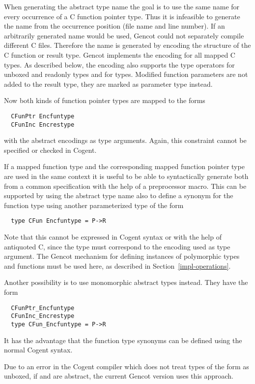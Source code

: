 When generating the abstract type name the goal is to use the same name 
for every occurrence of a C function pointer type. Thus it is infeasible to generate the name from 
the occurrence position (file name and line number). If an arbitrarily generated name would be used, 
Gencot could not separately compile different C files. Therefore the name is generated by encoding the structure of the 
C function or result type. Gencot implements the encoding for all mapped C types. As described
below, the encoding also supports the type operators for unboxed and readonly types and for  types.
Modified function parameters are not added to the result type, they are marked as parameter type instead.

Now both kinds of function pointer types are mapped to the forms
\begin{verbatim}
  CFunPtr Encfuntype
  CFunInc Encrestype
\end{verbatim}
with the abstract encodings as type arguments. Again, this constraint cannot be specified or checked in Cogent.

If a mapped function type and the corresponding mapped function pointer type are used in the same context it is useful to 
be able to syntactically generate both from a common specification with the help of a preprocessor macro. This can be
supported by using the abstract type name also to define a synonym for the function type using another parameterized
type of the form
\begin{verbatim}
  type CFun Encfuntype = P->R
\end{verbatim}
Note that this cannot be expressed in Cogent syntax or with the help of antiquoted C, since the type  must
correspond to the encoding used as type argument. The Gencot mechanism for defining instances of polymorphic types and
functions must be used here, as described in Section~\ref{impl-operations}.

Another possibility is to use monomorphic abstract types instead. They have the form
\begin{verbatim}
  CFunPtr_Encfuntype
  CFunInc_Encrestype
  type CFun_Encfuntype = P->R
\end{verbatim}
It has the advantage that the function type synonyms can be defined using the normal Cogent syntax.

Due to an error in the Cogent compiler which does not treat types of the form  as unboxed, if 
and  are abstract, the current Gencot version uses this approach.

